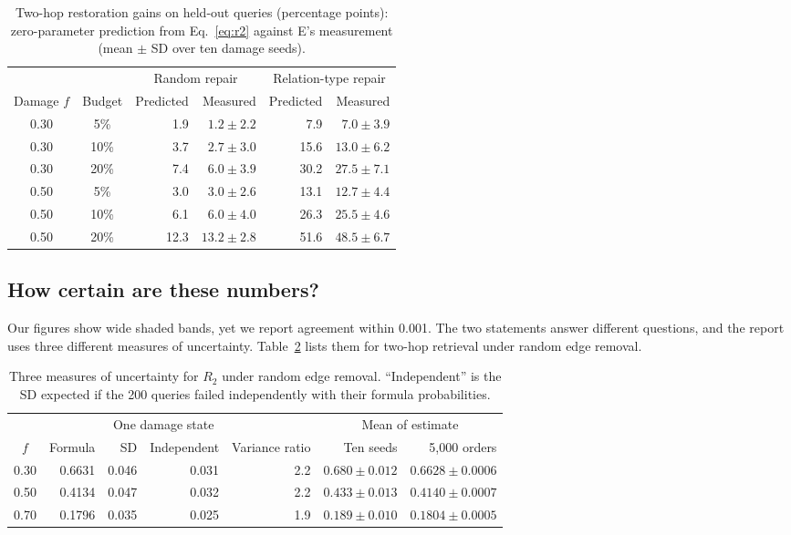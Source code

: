 \begin{table}[!htbp]
\centering
\small
\caption{Two-hop restoration gains on held-out queries (percentage points):
zero-parameter prediction from Eq.~\eqref{eq:r2} against E's measurement
(mean $\pm$ SD over ten damage seeds).}
\label{tab:d-restoration}
\begin{tabular}{@{}ccrrrr@{}}
\toprule
& & \multicolumn{2}{c}{Random repair} & \multicolumn{2}{c}{Relation-type repair} \\
\cmidrule(lr){3-4}\cmidrule(lr){5-6}
Damage $f$ & Budget & Predicted & Measured & Predicted & Measured \\
\midrule
0.30 & 5\%  & 1.9  & $1.2 \pm 2.2$  & 7.9  & $7.0 \pm 3.9$ \\
0.30 & 10\% & 3.7  & $2.7 \pm 3.0$  & 15.6 & $13.0 \pm 6.2$ \\
0.30 & 20\% & 7.4  & $6.0 \pm 3.9$  & 30.2 & $27.5 \pm 7.1$ \\
0.50 & 5\%  & 3.0  & $3.0 \pm 2.6$  & 13.1 & $12.7 \pm 4.4$ \\
0.50 & 10\% & 6.1  & $6.0 \pm 4.0$  & 26.3 & $25.5 \pm 4.6$ \\
0.50 & 20\% & 12.3 & $13.2 \pm 2.8$ & 51.6 & $48.5 \pm 6.7$ \\
\bottomrule
\end{tabular}
\end{table}

\subsection{How certain are these numbers?}
\label{sec:prediction-uncertainty}

Our figures show wide shaded bands, yet we report agreement within 0.001. The
two statements answer different questions, and the report uses three different
measures of uncertainty. Table~\ref{tab:d-uncertainty} lists them for two-hop
retrieval under random edge removal.

\begin{table}[!htbp]
\centering
\small
\caption{Three measures of uncertainty for $R_2$ under random edge removal.
``Independent'' is the SD expected if the 200 queries failed independently with
their formula probabilities.}
\label{tab:d-uncertainty}
\begin{tabular}{@{}crrrrrr@{}}
\toprule
& & \multicolumn{2}{c}{One damage state} & & \multicolumn{2}{c}{Mean of estimate} \\
\cmidrule(lr){3-4}\cmidrule(lr){6-7}
$f$ & Formula & SD & Independent & Variance ratio & Ten seeds & 5,000 orders \\
\midrule
0.30 & 0.6631 & 0.046 & 0.031 & 2.2 & $0.680 \pm 0.012$ & $0.6628 \pm 0.0006$ \\
0.50 & 0.4134 & 0.047 & 0.032 & 2.2 & $0.433 \pm 0.013$ & $0.4140 \pm 0.0007$ \\
0.70 & 0.1796 & 0.035 & 0.025 & 1.9 & $0.189 \pm 0.010$ & $0.1804 \pm 0.0005$ \\
\bottomrule
\end{tabular}
\end{table}

